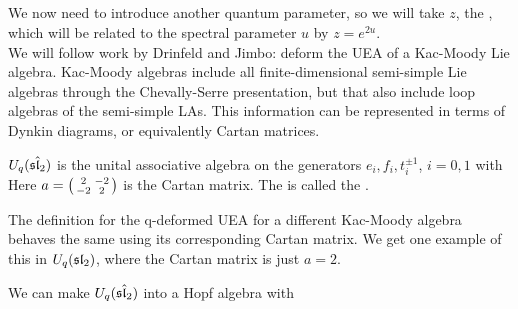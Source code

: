\documentclass{article}
\begin{document}
\subsection{}

We now need to introduce another quantum parameter, so we will take $z$, the , which will be related to the spectral parameter $u$ by $z = e^{2u}$. \\
We will follow work by Drinfeld and Jimbo: deform the UEA of a Kac-Moody Lie algebra. Kac-Moody algebras include all finite-dimensional semi-simple Lie algebras through the Chevally-Serre presentation, but that also include loop algebras of the semi-simple LAs. This information can be represented in terms of Dynkin diagrams, or equivalently Cartan matrices. \\

\begin{definition}
$U_q(\hat{\mathfrak{sl}_2})$ is the unital associative algebra on the generators $e_i,f_i, t_i^{\pm 1}$, $i =0,1$ with 
Here $a = \begin{psmallmatrix} 2 & -2 \\ -2 & 2 \end{psmallmatrix}$ is the Cartan matrix. The is called the .
\end{definition}

\begin{remark}
The definition for the q-deformed UEA for a different Kac-Moody algebra behaves the same using its corresponding Cartan matrix. We get one example of this in $U_q(\mathfrak{sl}_2)$, where the Cartan matrix is just $a=2$. 
\end{remark}

\begin{prop}
We can make $U_q(\hat{\mathfrak{sl}_2})$ into a Hopf algebra with 
\end{prop}
\end{document}
